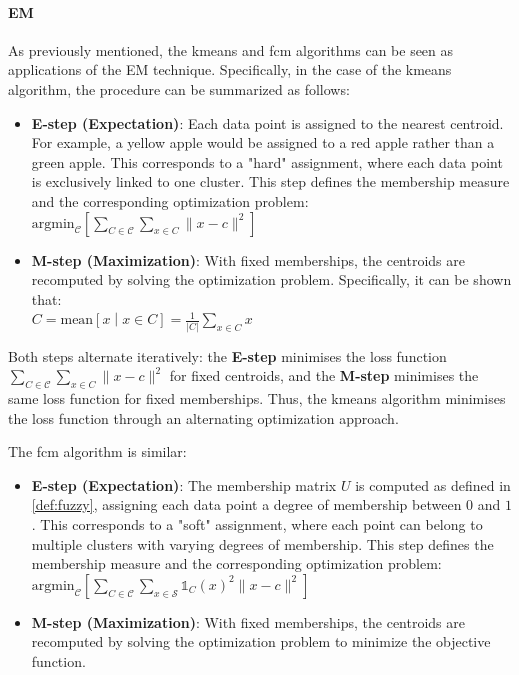 \paragraph{EM} As previously mentioned, the \gls{kmeans} and \gls{fcm} algorithms can be seen as applications of the EM technique. Specifically, in the case of the \gls{kmeans} algorithm, the procedure can be summarized as follows:
\begin{itemize}
	\item \textbf{E-step (Expectation)}: Each data point is assigned to the nearest centroid. For example, a yellow apple would be assigned to a red apple rather than a green apple. This corresponds to a "hard" assignment, where each data point is exclusively linked to one cluster. This step defines the membership measure and the corresponding optimization problem:\\ $\text{argmin}_\mathcal{C}\left[\sum_{C\in\mathcal{C}}\sum_{x \in C}\|x-c\|^2\right]$
	 \item \textbf{M-step (Maximization)}: With fixed memberships, the centroids are recomputed by solving the optimization problem. Specifically, it can be shown that:\\ $C = \text{mean}\left[x\middle|x\in C\right] = \frac1{|C|}\sum_{x\in C} x$
\end{itemize}
\noindent Both steps alternate iteratively: the \textbf{E-step} minimises the loss function \\ $\sum_{C\in\mathcal{C}}\sum_{x \in C}\|x-c\|^2$ for fixed centroids, and the \textbf{M-step} minimises the same loss function for fixed memberships. Thus, the \gls{kmeans} algorithm minimises the loss function through an alternating optimization approach.

\noindent The \gls{fcm} algorithm is similar:
\begin{itemize}
	\item \textbf{E-step (Expectation)}: The membership matrix $U$ is computed as defined in \cref{def:fuzzy}, assigning each data point a degree of membership between $0$ and $1$. This corresponds to a "soft" assignment, where each point can belong to multiple clusters with varying degrees of membership. This step defines the membership measure and the corresponding optimization problem:\\ $\text{argmin}_\mathcal{C}\left[\sum_{C\in\mathcal{C}}\sum_{x \in \mathcal{S}}\mathds{1}_C(x)^2\|x-c\|^2\right]$
	\item \textbf{M-step (Maximization)}: With fixed memberships, the centroids are recomputed by solving the optimization problem to minimize the objective function.
\end{itemize}

